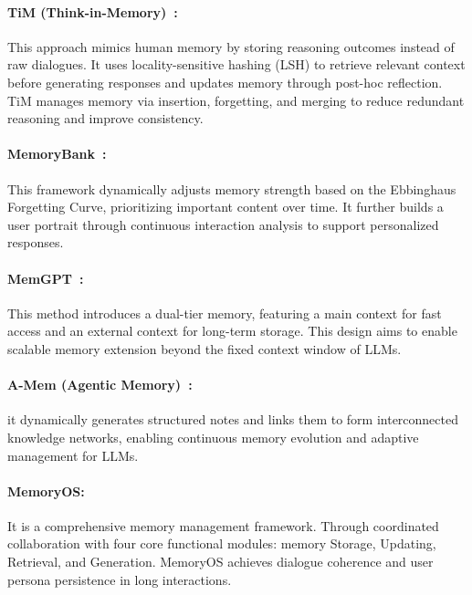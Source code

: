 \documentclass[11pt]{article}
\begin{document}
\paragraph{TiM (Think-in-Memory)~\cite{liu2023think}:}
This approach mimics human memory by storing reasoning outcomes instead of raw dialogues. It uses locality-sensitive hashing (LSH) to retrieve relevant context before generating responses and updates memory through post-hoc reflection. TiM manages memory via insertion, forgetting, and merging to reduce redundant reasoning and improve consistency.
\paragraph{MemoryBank~\cite{zhong2024memorybank}:} This framework dynamically adjusts memory strength based on the Ebbinghaus Forgetting Curve, prioritizing important content over time. It further builds a user portrait through continuous interaction analysis to support personalized responses.
\paragraph{MemGPT~\cite{packer2023memgpt}:} This method introduces a dual-tier memory, featuring a main context for fast access and an external context for long-term storage. This design aims to enable scalable memory extension beyond the fixed context window of LLMs.
\paragraph{A-Mem (Agentic Memory)~\cite{xu2025mem}:} it dynamically generates structured notes and links them to form interconnected knowledge networks, enabling continuous memory evolution and adaptive management for LLMs.
\paragraph{\textbf{MemoryOS}:} It is a comprehensive memory management framework. Through coordinated collaboration with four core functional modules: memory Storage, Updating, Retrieval, and Generation. MemoryOS achieves dialogue coherence and user persona persistence in long interactions.
\end{document}
